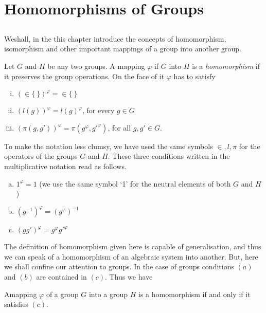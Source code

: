 
\chapter{Homomorphisms of Groups}\label{chap3} %

\section{}\label{chap3:sec1}%

We\pageoriginale shall, in the this chapter introduce the concepts of
homomorphism, 
isomorphism and other important mappings of a group into another
group. 

Let $G$ and $H$ be any two groups. A mapping $\varphi$ if $G$ into $H$
is a \textit{homomorphism} if it preserves the group operations. On
the face of it $\varphi$ has to satisfy 
\begin{enumerate}[(i)]
\item $(\in \{ ~ \})^{\varphi} = \in \{ ~ \}$ 
\item $(l (g))^{\varphi} = l (g)^{\varphi}$, for every $g \in  G$
\item $(\pi (g, g'))^{\varphi} = \pi (g^\varphi,  g{'}^\varphi)$,
  for all $g, g' \in  G$. 
\end{enumerate}

To make the notation less clumsy, we have used the same symbols $\in, 
l,  \pi$ for the operators of the groups $G$ and $H$. These three
conditions written in the multiplicative notation read as follows.  
\begin{enumerate}[(a)]
\item $1^{\varphi} = 1$ (we use the same symbol `1' for the neutral
  elements of both $G$ and $H$) 
\item $(g^{-1})^{\varphi} = (g^\varphi)^{-1}$
\item $(gg')^\varphi = g^\varphi g{'}^\varphi$
\end{enumerate}

The definition of homomorphism given here is capable of
generalisation, and thus we can speak of a homomorphism of an
algebraic system into another. But, here we shall confine our
attention to groups. In the case of groups conditions $(a)$ and $(b)$
are contained in $(c)$. Thus we have 

\setcounter{theorem}{0}
\begin{theorem}\label{chap3:sec1:thm1}%
  A\pageoriginale mapping $\varphi$ of a group $G$ into a group $H$ is a
  homomorphism if and only if it satisfies $(c)$. 
\end{theorem}

